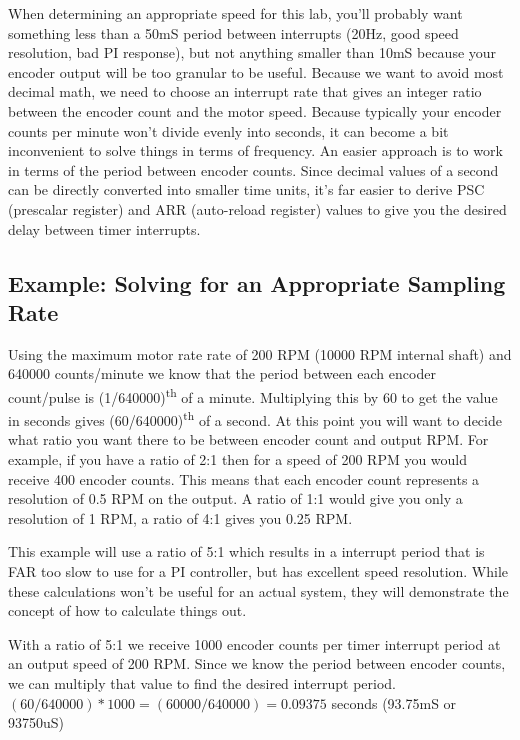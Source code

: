\documentclass[11pt,fleqn]{book} %
\begin{document}
When determining an appropriate speed for this lab, you'll probably want something less than a 50mS period between interrupts (20Hz, good speed resolution, bad PI response), but not anything smaller than 10mS because your encoder output will be too granular to be useful. Because we want to avoid most decimal math, we need to choose an interrupt rate that gives an integer ratio between the encoder count and the motor speed. Because typically your encoder counts per minute won't divide evenly into seconds, it can become a bit inconvenient to solve things in terms of frequency. An easier approach is to work in terms of the period between encoder counts. Since decimal values of a second can be directly converted into smaller time units, it's far easier to derive PSC (prescalar register) and ARR (auto-reload register) values to give you the desired delay between timer interrupts.


\subsection{Example: Solving for an Appropriate Sampling Rate}

Using the maximum motor rate rate of 200 RPM (10000 RPM internal shaft) and 640000 counts/minute we know that the period between each encoder count/pulse is (1/640000)\textsuperscript{th} of a minute. Multiplying this by 60 to get the value in seconds gives (60/640000)\textsuperscript{th} of a second. 
At this point you will want to decide what ratio you want there to be between encoder count and output RPM. For example, if you have a ratio of 2:1 then for a speed of 200 RPM you would receive 400 encoder counts. This means that each encoder count represents a resolution of 0.5 RPM on the output. A ratio of 1:1 would give you only a resolution of 1 RPM, a ratio of 4:1 gives you 0.25 RPM. 

This example will use a ratio of 5:1 which results in a interrupt period that is FAR too slow to use for a PI controller, but has excellent speed resolution. While these calculations won't be useful for an actual system, they will demonstrate the concept of how to calculate things out. 

With a ratio of 5:1 we receive 1000 encoder counts per timer interrupt period at an output speed of 200 RPM. Since we know the period between encoder counts, we can multiply that value to find the desired interrupt period. $(60/640000)*1000 = (60000/640000) = 0.09375$ seconds (93.75mS or 93750uS)
\end{document}
